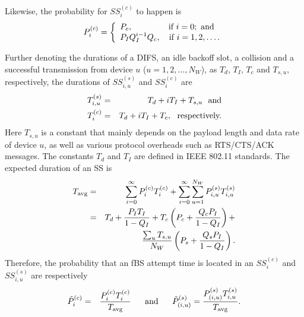 \documentclass[journal,final,letterpaper,10pt,doublecolumn,twoside]{IEEEtran}
\begin{document}
Likewise, the probability for $SS^{(c)}_{i}$ to happen is
\begin{eqnarray}
P^{(c)}_{i} =  \left\{ \begin{array}{l}
P_c, ~~~~~~~~~~~~~ \textmd{if}~ i=0; ~ \textmd{and} \\
P_I Q_I^{i-1}Q_c, ~~~ \textmd{if}~ i=1, 2, \dots .
\end{array} \right .
\end{eqnarray}


Further denoting the durations of a DIFS, an idle backoff slot,  a
collision and a successful transmission from device $u$ ($u=1, 2,
\dots, N_W$), as $T_d$, $T_I$, $T_c$ and $T_{s,u}$, respectively,
the durations of $SS^{(s)}_{i,u}$ and $SS^{(c)}_{i}$ are
\begin{eqnarray}
T^{(s)}_{i,u} &=& T_d + i T_I + T_{s,u} ~~ \textmd{and}
\label{eq:T-SuperSlot-c} \\
T^{(c)}_{i} &=& T_d + i T_I + T_c  ,  ~~ \textmd{respectively.}
\label{eq:T-SuperSlot-c}
\end{eqnarray}
Here $T_{s,u}$ is a constant that mainly depends on the payload
length and data rate of device $u$, as well as various protocol
overheads such as RTS/CTS/ACK messages. The constants $T_d$ and
$T_I$ are defined in IEEE 802.11 standards. The expected duration of
an SS is
\begin{eqnarray}
T_{\textmd{avg}} &=& \sum_{i=0}^{\infty} P^{(c)}_{i} T^{(c)}_{i} +   \sum_{i=0}^{\infty} \sum_{u=1}^{N_W} P^{(s)}_{i,u} T^{(s)}_{i,u} \nonumber \\
&=&   T_d + \frac{ P_I T_I }{1- Q_I} +   T_c \left( P_c + \frac{Q_c
P_I}{1- Q_I} \right )   +  \nonumber \\
&& \frac{ \sum_u T_{s,u} }{N_W} \left( P_s + \frac{Q_s P_I}{1- Q_I}
\right )    . \label{eq:T_AvgSuperSlot}
\end{eqnarray}
Therefore, the probability that an fBS attempt time is located in an
$SS^{(c)}_{i}$ and $SS^{(s)}_{i,u}$ are respectively
\begin{eqnarray}
\tilde{P}^{(c)}_{i} &=&
 \frac{ P^{(c)}_{i}T^{(c)}_{i}  }{ T_{\textmd{avg}} }
  ~~~~~  \textmd{and}  ~~~~~
\tilde{P}^{(s)}_{(i,u)}
 = \frac{ P^{(s)}_{(i,u)} T^{(s)}_{i,u}  }{ T_{\textmd{avg}} } .
\end{eqnarray}
\end{document}
